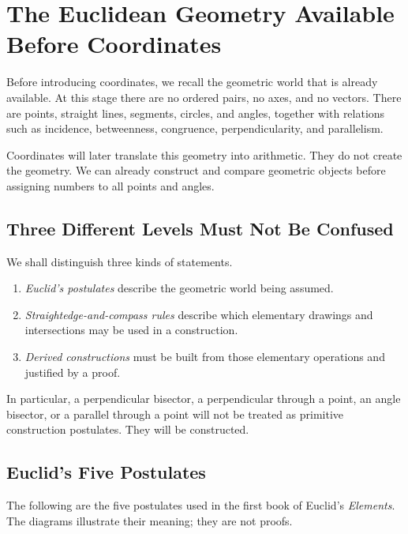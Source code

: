 \section{The Euclidean Geometry Available Before Coordinates}

Before introducing coordinates, we recall the geometric world that is already
available. At this stage there are no ordered pairs, no axes, and no vectors.
There are points, straight lines, segments, circles, and angles, together with
relations such as incidence, betweenness, congruence, perpendicularity, and
parallelism.

\begin{remarkbox}
Coordinates will later translate this geometry into arithmetic. They do not
create the geometry. We can already construct and compare geometric objects
before assigning numbers to all points and angles.
\end{remarkbox}

\subsection{Three Different Levels Must Not Be Confused}

We shall distinguish three kinds of statements.

\begin{enumerate}
    \item \emph{Euclid's postulates} describe the geometric world being assumed.
    \item \emph{Straightedge-and-compass rules} describe which elementary
          drawings and intersections may be used in a construction.
    \item \emph{Derived constructions} must be built from those elementary
          operations and justified by a proof.
\end{enumerate}

In particular, a perpendicular bisector, a perpendicular through a point, an
angle bisector, or a parallel through a point will not be treated as primitive
construction postulates. They will be constructed.

\subsection{Euclid's Five Postulates}

The following are the five postulates used in the first book of Euclid's
\emph{Elements}. The diagrams illustrate their meaning; they are not proofs.

